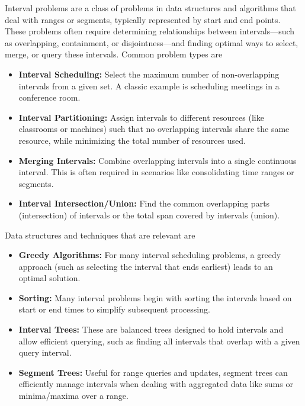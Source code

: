 \documentclass{report}
\begin{document}
\pagebreak 
{}
\bigbreak \noindent 
Interval problems are a class of problems in data structures and algorithms that deal with ranges or segments, typically represented by start and end points. These problems often require determining relationships between intervals—such as overlapping, containment, or disjointness—and finding optimal ways to select, merge, or query these intervals.
\bigbreak \noindent 
Common problem types are
\begin{itemize}
    \item \textbf{Interval Scheduling:} Select the maximum number of non-overlapping intervals from a given set. A classic example is scheduling meetings in a conference room.
    \item \textbf{Interval Partitioning:} Assign intervals to different resources (like classrooms or machines) such that no overlapping intervals share the same resource, while minimizing the total number of resources used.
    \item \textbf{Merging Intervals:} Combine overlapping intervals into a single continuous interval. This is often required in scenarios like consolidating time ranges or segments.
    \item \textbf{Interval Intersection/Union:} Find the common overlapping parts (intersection) of intervals or the total span covered by intervals (union).
\end{itemize}
\bigbreak \noindent 
Data structures and techniques that are relevant are
\begin{itemize}
    \item \textbf{Greedy Algorithms:} For many interval scheduling problems, a greedy approach (such as selecting the interval that ends earliest) leads to an optimal solution.
    \item \textbf{Sorting:} Many interval problems begin with sorting the intervals based on start or end times to simplify subsequent processing.
    \item \textbf{Interval Trees:} These are balanced trees designed to hold intervals and allow efficient querying, such as finding all intervals that overlap with a given query interval.
    \item \textbf{Segment Trees:} Useful for range queries and updates, segment trees can efficiently manage intervals when dealing with aggregated data like sums or minima/maxima over a range.
\end{itemize}

\bigbreak \noindent 
\end{document}
